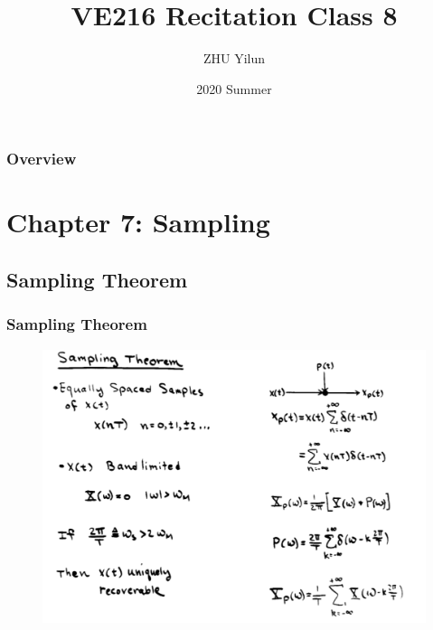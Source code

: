 \documentclass{beamer}
\title[VE216]{VE216 Recitation Class 8} %
\author{ZHU Yilun} %
\institute[SJTU] %
{
UM-SJTU Joint Institute \\ %
\medskip
\textit{VE216 SU20 TA Group} %
}
\date{2020 Summer} %
\begin{document}
\begin{frame}
\titlepage %
\end{frame}

\begin{frame}
\frametitle{Overview} %
\tableofcontents %
\end{frame}



\section{Chapter 7: Sampling}

\subsection{Sampling Theorem}
\begin{frame}
\frametitle{Sampling Theorem}
\begin{figure}
\includegraphics[width=0.8\linewidth]{sample1}
\end{figure}
\end{frame}
\end{document}

